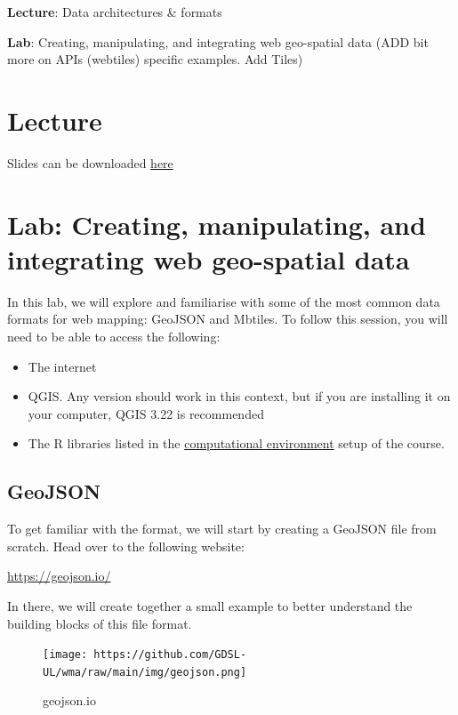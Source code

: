 \documentclass[
  letterpaper,
  DIV=11,
  numbers=noendperiod]{scrreprt}
\providecommand{\tightlist}{%
  \setlength{\itemsep}{0pt}\setlength{\parskip}{0pt}}\usepackage{longtable,booktabs,array}
\begin{document}
\textbf{Lecture}: Data architectures \& formats

\textbf{Lab}: Creating, manipulating, and integrating web geo-spatial
data (ADD bit more on APIs (webtiles) specific examples. Add Tiles)

\hypertarget{lecture-2}{%
\section{Lecture}\label{lecture-2}}

Slides can be downloaded
\href{https://github.com/GDSL-UL/wma/raw/main/pdf/lecture_03.pdf}{here}

\hypertarget{lab-creating-manipulating-and-integrating-web-geo-spatial-data}{%
\section{Lab: Creating, manipulating, and integrating web geo-spatial
data}\label{lab-creating-manipulating-and-integrating-web-geo-spatial-data}}

In this lab, we will explore and familiarise with some of the most
common data formats for web mapping: GeoJSON and Mbtiles. To follow this
session, you will need to be able to access the following:

\begin{itemize}
\tightlist
\item
  The internet
\item
  QGIS. Any version should work in this context, but if you are
  installing it on your computer, QGIS 3.22 is recommended
\item
  The R libraries listed in the
  \href{https://gdsl-ul.github.io/wma/overview.html\#computational-environment}{computational
  environment} setup of the course.
\end{itemize}

\hypertarget{geojson}{%
\subsection{GeoJSON}\label{geojson}}

To get familiar with the format, we will start by creating a GeoJSON
file from scratch. Head over to the following website:

\url{https://geojson.io/}

In there, we will create together a small example to better understand
the building blocks of this file format.

\begin{figure}

{\centering \texttt{[image: https://github.com/GDSL-UL/wma/raw/main/img/geojson.png]}

}

\caption{geojson.io}

\end{figure}
\end{document}
